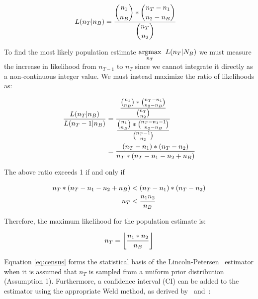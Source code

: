 \begin{align}
    \begin{split}
        L(n_{T} | n_{B}) &= \frac{\displaystyle \binom{n_{1}}{n_{B}} * \binom{n_{T} - n_{1}}{n_{2} - n_{B}}}{\displaystyle \binom{n_{T}}{n_{2}}}
    \end{split}
\end{align}

\noindent To find the most likely population estimate $\underset{n_{T}}{\mathrm{argmax}}\hspace{0.2cm} L(n_{T} | N_{B})$ we must measure the increase in likelihood from $n_{T-1}$ to $n_{T}$ since we cannot integrate it directly as a non-continuous integer value.  We must instead maximize the ratio of likelihoods as:

\begin{align}
    \begin{split}
        \frac{L(n_{T} | n_{B})}{L(n_{T} - 1 | n_{B})} &= \frac{\displaystyle \frac{\binom{n_{1}}{n_{B}} * \binom{n_{T} - n_{1}}{n_{2} - n_{B}}}{\binom{n_{T}}{n_{2}}}}{\displaystyle \frac{\binom{n_{1}}{n_{B}} * \binom{n_{T} - n_{1} - 1}{n_{2} - n_{B}}}{\binom{n_{T} - 1}{n_{2}}}} \\
        &= \frac{\displaystyle (n_{T} - n_{1})*(n_{T} - n_{2})}{\displaystyle n_{T} * (n_{T} - n_{1} - n_{2} + n_{B})}
    \end{split}
\end{align}

\noindent The above ratio exceeds 1 if and only if

\begin{align}
    \begin{split}
        n_{T} * (n_{T} - n_{1} - n_{2} + n_{B}) &< (n_{T} - n_{1})*(n_{T} - n_{2}) \\
        n_{T} &< \frac{\displaystyle n_{1}n_{2}}{\displaystyle n_{B}}
    \end{split}
\end{align}

\noindent Therefore, the maximum likelihood for the population estimate is:

\begin{align} \label{eq:census}
    \begin{split}
        n_{T} = \left\lfloor \frac{\displaystyle n_{1}*n_{2}}{\displaystyle n_{B}} \right\rfloor
    \end{split}
\end{align}

\noindent Equation \eqref{eq:census} forms the statistical basis of the Lincoln-Petersen~\cite{petersen_valuation_1911} estimator when it is assumed that $n_{T}$ is sampled from a uniform prior distribution (Assumption 1).  Furthermore, a confidence interval (CI) can be added to the estimator using the appropriate Weld method, as derived by~\cite{seber_estimation_1982} and~\cite{chapman_fallow_1975}:


